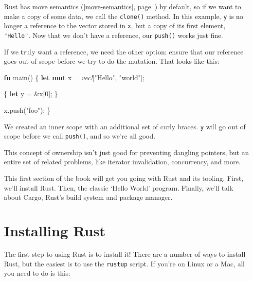 \documentclass[a4paper,]{book}
\renewcommand*{\hyperref}[2][\ar]{%
  \def\ar{#2}%
  #2 (\autoref{#1}, page~\pageref{#1})}
\newenvironment{Shaded}{\begin{snugshade}}{\end{snugshade}}
\newcommand{\KeywordTok}[1]{\textcolor[rgb]{0.13,0.29,0.53}{\textbf{{#1}}}}
\newcommand{\DecValTok}[1]{\textcolor[rgb]{0.00,0.00,0.81}{{#1}}}
\newcommand{\StringTok}[1]{\textcolor[rgb]{0.31,0.60,0.02}{{#1}}}
\newcommand{\PreprocessorTok}[1]{\textcolor[rgb]{0.56,0.35,0.01}{\textit{{#1}}}}
\newcommand{\NormalTok}[1]{{#1}}
\begin{document}
Rust has \hyperref[move-semantics]{move semantics} by default, so if we
want to make a copy of some data, we call the \texttt{clone()} method.
In this example, \texttt{y} is no longer a reference to the vector
stored in \texttt{x}, but a copy of its first element, \texttt{"Hello"}.
Now that we don't have a reference, our \texttt{push()} works just fine.

If we truly want a reference, we need the other option: ensure that our
reference goes out of scope before we try to do the mutation. That looks
like this:

\begin{Shaded}
\begin{Highlighting}[]
\KeywordTok{fn} \NormalTok{main() \{}
    \KeywordTok{let} \KeywordTok{mut} \NormalTok{x = }\PreprocessorTok{vec!}\NormalTok{[}\StringTok{"Hello"}\NormalTok{, }\StringTok{"world"}\NormalTok{];}

    \NormalTok{\{}
        \KeywordTok{let} \NormalTok{y = &x[}\DecValTok{0}\NormalTok{];}
    \NormalTok{\}}

    \NormalTok{x.push(}\StringTok{"foo"}\NormalTok{);}
\NormalTok{\}}
\end{Highlighting}
\end{Shaded}

We created an inner scope with an additional set of curly braces.
\texttt{y} will go out of scope before we call \texttt{push()}, and so
we're all good.

This concept of ownership isn't just good for preventing dangling
pointers, but an entire set of related problems, like iterator
invalidation, concurrency, and more.


This first section of the book will get you going with Rust and its
tooling. First, we'll install Rust. Then, the classic `Hello World'
program. Finally, we'll talk about Cargo, Rust's build system and
package manager.

\section{Installing Rust}\label{sec--installing-rust}

The first step to using Rust is to install it! There are a number of
ways to install Rust, but the easiest is to use the \texttt{rustup}
script. If you're on Linux or a Mac, all you need to do is this:
\end{document}
